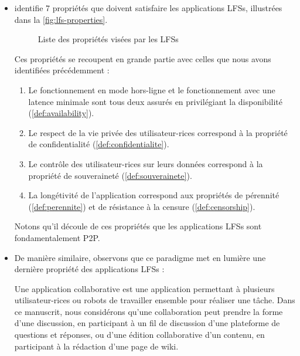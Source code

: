 \begin{itemize}
    \item \cite{localfirstsoftware2019} identifie 7 propriétés que doivent satisfaire les applications \acp{LFS}, illustrées dans la \autoref{fig:lfs-properties}.
      \begin{figure}[!ht]
        \centering
        \caption[Caption for lfs-properties]{Liste des propriétés visées par les \acp{LFS}\footnotemark}
        \label{fig:lfs-properties}
      \end{figure}
      Ces propriétés se recoupent en grande partie avec celles que nous avons identifiées précédemment :
      \begin{enumerate}
        \item Le fonctionnement en mode hors-ligne et le fonctionnement avec une latence minimale sont tous deux assurés en privilégiant la disponibilité \cite{pacelc2012} (\autoref{def:availability}).
        \item Le respect de la vie privée des utilisateur-rices correspond à la propriété de confidentialité (\autoref{def:confidentialite}).
        \item Le contrôle des utilisateur-rices sur leurs données correspond à la propriété de souveraineté (\autoref{def:souverainete}).
        \item La longétivité de l'application correspond aux propriétés de pérennité (\autoref{def:perennite}) et de résistance à la censure (\autoref{def:censorship}).
      \end{enumerate}
      Notons qu'il découle de ces propriétés que les applications \acp{LFS} sont fondamentalement \ac{P2P}.
    \item De manière similaire, observons que ce paradigme met en lumière une dernière propriété des applications \acp{LFS} :
      \begin{definition}[Collaborative]
        \label{def:collaborative}
        Une application collaborative est une application permettant à plusieurs utilisateur-rices ou robots de travailler ensemble pour réaliser une tâche.
        Dans ce manuscrit, nous considérons qu'une collaboration peut prendre la forme d'une discussion, \eg en participant à un fil de discussion d'une plateforme de questions et réponses, ou d'une édition collaborative d'un contenu, \eg en participant à la rédaction d'une page de wiki.

\end{definition}
\end{itemize}
